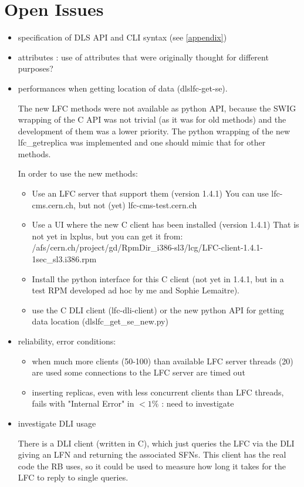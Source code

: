\documentclass[pdftex]{cmspaper}
\begin{document}
\section{Open Issues}
\begin{itemize}
 \item specification of DLS API and CLI syntax (see \ref{appendix})
 \item attributes : use of attributes that were originally thought for different purposes?
 \item performances when getting location of data (dlslfc-get-se). 

The new LFC methods were not available as python API, because the SWIG wrapping of the C API was not trivial (as it was for old methods) and the development of them was a lower priority. The python wrapping of the new lfc\_getreplica was implemented and one should mimic that for other methods.


In order to use the new methods:
\begin{itemize}

\item Use an LFC server that support them (version 1.4.1)
    You can use lfc-cms.cern.ch, but not (yet) lfc-cms-test.cern.ch
\item Use a UI where the new C client has been installed (version 1.4.1)
    That is not yet in lxplus, but you can get it from:
    /afs/cern.ch/project/gd/RpmDir\_i386-sl3/lcg/LFC-client-1.4.1-1sec\_sl3.i386.rpm
\item Install the python interface for this C client (not yet in 1.4.1, but
in a test RPM developed ad hoc by me and Sophie Lemaitre).

\item use the C DLI client (lfc-dli-client) or the new python API for getting data location (dlslfc\_get\_se\_new.py)
\end{itemize}


 
 \item reliability, error conditions: 
       \begin{itemize}
       \item when much more clients (50-100) than available LFC server threads (20) are used some connections 
       to the LFC server are timed out
       \item inserting replicas, even with less concurrent clients than LFC threads, fails with "Internal Error" in $<1\%$ : need to investigate
      \end{itemize}
 \item investigate DLI usage

 There is a DLI client (written in C), which just queries the LFC via
 the DLI giving an LFN and returning the associated SFNs. This client has
 the real code the RB uses, so it could be used to measure how long it
 takes for the LFC to reply to single queries.


\end{itemize}  
\end{document}
